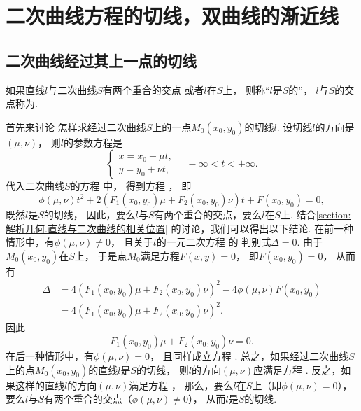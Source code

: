 \section{二次曲线方程的切线，双曲线的渐近线}\label{section:解析几何.二次曲线方程的切线}
\subsection{二次曲线经过其上一点的切线}
\begin{definition}
如果直线\(l\)与二次曲线\(S\)有两个重合的交点
或者\(l\)在\(S\)上，
则称“\(l\)是\(S\)的”，
\(l\)与\(S\)的交点称为.
\end{definition}

首先来讨论
怎样求经过二次曲线\(S\)上的一点\(M_0(x_0,y_0)\)的切线\(l\).
设切线\(l\)的方向是\((\mu,\nu)\)，
则\(l\)的参数方程是\begin{equation*}
	\left\{ \begin{array}{l}
		x = x_0 + \mu t, \\
		y = y_0 + \nu t,
	\end{array} \right.
	\quad -\infty < t < +\infty.
\end{equation*}
代入二次曲线\(S\)的方程  中，
得到方程 ，
即\begin{equation}
	\phi(\mu,\nu) t^2
	+ 2 (
		F_1(x_0,y_0) \mu
		+ F_2(x_0,y_0) \nu
	) t
	+ F(x_0,y_0)
	= 0,
\end{equation}
既然\(l\)是\(S\)的切线，
因此，要么\(l\)与\(S\)有两个重合的交点，要么\(l\)在\(S\)上.
结合\cref{section:解析几何.直线与二次曲线的相关位置} 的讨论，我们可以得出以下结论.
在前一种情形中，有\(\phi(\mu,\nu) \neq 0\)，
且关于\(t\)的一元二次方程  的
判别式\(\Delta = 0\).
由于\(M_0(x_0,y_0)\)在\(S\)上，
于是点\(M_0\)满足方程\(F(x,y) = 0\)，
即\(F(x_0,y_0) = 0\)，
从而有\begin{align*}
	\Delta
	&= 4 (F_1(x_0,y_0) \mu + F_2(x_0,y_0) \nu)^2 - 4 \phi(\mu,\nu) F(x_0,y_0) \\
	&= 4 (F_1(x_0,y_0) \mu + F_2(x_0,y_0) \nu)^2.
\end{align*}
因此\begin{equation}\label{equation:二次曲线方程的切线.切向量方程}
	F_1(x_0,y_0) \mu + F_2(x_0,y_0) \nu = 0.
\end{equation}
在后一种情形中，有\(\phi(\mu,\nu) = 0\)，
且同样成立方程 .
总之，如果经过二次曲线\(S\)上的点\(M_0(x_0,y_0)\)的直线\(l\)是\(S\)的切线，
则\(l\)的方向\((\mu,\nu)\)应满足方程 .
反之，如果这样的直线\(l\)的方向\((\mu,\nu)\)满足方程 ，
那么，要么\(l\)在\(S\)上（即\(\phi(\mu,\nu) = 0\)），
要么\(l\)与\(S\)有两个重合的交点（\(\phi(\mu,\nu) \neq 0\)），
从而\(l\)是\(S\)的切线.

